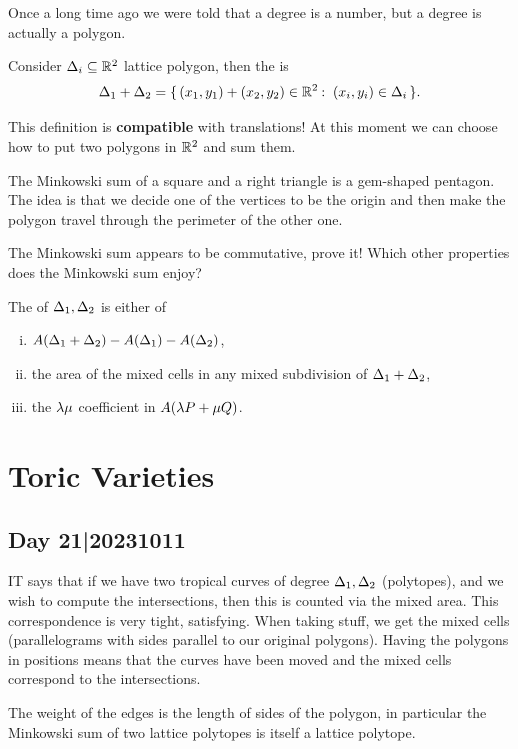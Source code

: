 \documentclass[12pt]{memoir}
\begin{document}
Once a long time ago we were told that a degree is a number, but a degree is actually a polygon.
\begin{Def}
    Consider $\Delta_i\subseteq\mathbb{R}^2$ lattice polygon, then the  is 
    $$\Dl_1+\Dl_2=\set{(x_1,y_1)+(x_2,y_2)\in\bR^2\:\ (x_i,y_i)\in\Dl_i}.$$
\end{Def}
This definition is \textbf{compatible} with translations! At this moment we can choose how to put two polygons in $\mathbb{R}^2$ and sum them. 

\begin{Ex}
    The Minkowski sum of a square and a right triangle is a gem-shaped pentagon. The idea is that we decide one of the vertices to be the origin and then make the polygon travel through the perimeter of the other one.
\end{Ex}

\begin{Ej}
The Minkowski sum appears to be commutative, prove it! Which other properties does the Minkowski sum enjoy?
\end{Ej}

\begin{Ex}
\end{Ex}

\begin{Def}
    The  of $\Delta_1,\Delta_2$ is either of 
    \begin{enumerate}[i)]
        \item $A(\Delta_1+\Delta_2)-A(\Delta_1)-A(\Delta_2)$,
        \item the area of the mixed cells in any mixed subdivision of $\Delta_1+\Delta_2$,
        \item the $\lambda\mu$ coefficient in $A(\lambda P+\mu Q)$.
    \end{enumerate}
\end{Def}

\chapter{Toric Varieties}
\section{Day 21|20231011}

IT says that if we have two tropical curves of degree $\Delta_1,\Delta_2$ (polytopes), and we wish to compute the intersections, then this is counted via the mixed area. This correspondence is very tight, satisfying. When taking stuff, we get the mixed cells (parallelograms with sides parallel to our original polygons). Having the polygons in positions means that the curves have been moved and the mixed cells correspond to the intersections.\par 
The weight of the edges is the length of sides of the polygon, in particular the Minkowski sum of two lattice polytopes is itself a lattice polytope.
\end{document}
